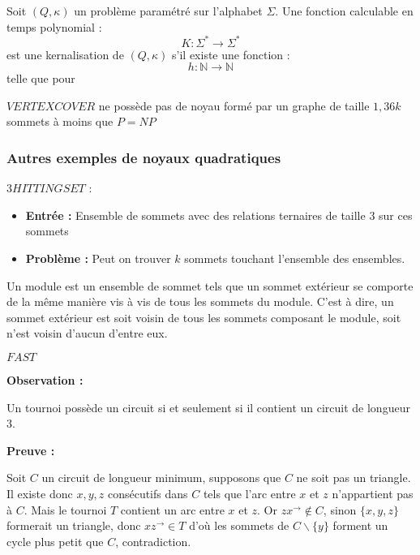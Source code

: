 \documentclass[a4paper, 11pt]{thesis}
\begin{document}


\begin{df}
    Soit $(Q, \kappa)$ un problème paramétré sur l'alphabet $\Sigma$. Une fonction calculable en
    temps polynomial : $$
    K : \Sigma^* \longrightarrow \Sigma^* $$
    est une kernalisation de $(Q, \kappa)$ s'il existe une fonction : $$
    h : \mathbb{N} \longrightarrow \mathbb{N} $$
    telle que pour 
\end{df}

\begin{thrm}
\end{thrm}

\begin{thrm}
    $VERTEX COVER$ ne possède pas de noyau formé par un graphe de taille $1,36 k$ sommets à moins
    que $P = NP$
\end{thrm}

\subsubsection{Autres exemples de noyaux quadratiques}

$3 HITTING SET$ :
\begin{itemize}
    \item \textbf{Entrée :} Ensemble de sommets avec des relations ternaires de taille $3$ sur ces
        sommets
    \item \textbf{Problème :} Peut on trouver $k$ sommets touchant l'ensemble des ensembles.
\end{itemize}

\begin{df}
    Un module est un ensemble de sommet tels que un sommet extérieur se comporte de la même manière
    vis à vis de tous les sommets du module. C'est à dire, un sommet extérieur est soit voisin de
    tous les sommets composant le module, soit n'est voisin d'aucun d'entre eux.
\end{df}

$FAST$

\textbf{Observation :}

Un tournoi possède un circuit si et seulement si il contient un circuit de longueur $3$.

\textbf{Preuve :}

Soit $C$ un circuit de longueur minimum, supposons que $C$ ne soit pas un triangle. Il existe donc
$x, y, z$ consécutifs dans $C$ tels que l'arc entre $x$ et $z$ n'appartient pas à $C$. Mais le
tournoi $T$ contient un arc entre $x$ et $z$. Or $zx ^ \rightarrow \not \in C$, sinon $\{x, y, z\}$
formerait un triangle, donc $xz ^ \rightarrow \in T$ d'où les sommets de $C \backslash \{y\}$
forment un cycle plus petit que $C$, contradiction.
\end{document}
